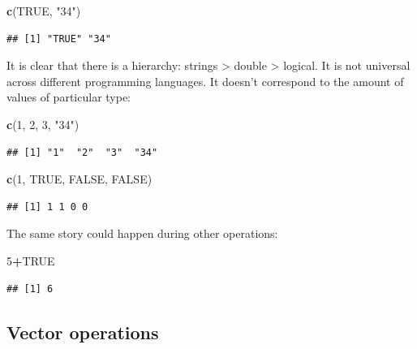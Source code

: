 \documentclass[
]{book}
\newenvironment{Shaded}{\begin{snugshade}}{\end{snugshade}}
\newcommand{\DecValTok}[1]{\textcolor[rgb]{0.00,0.00,0.81}{#1}}
\newcommand{\KeywordTok}[1]{\textcolor[rgb]{0.13,0.29,0.53}{\textbf{#1}}}
\newcommand{\NormalTok}[1]{#1}
\newcommand{\OperatorTok}[1]{\textcolor[rgb]{0.81,0.36,0.00}{\textbf{#1}}}
\newcommand{\OtherTok}[1]{\textcolor[rgb]{0.56,0.35,0.01}{#1}}
\newcommand{\StringTok}[1]{\textcolor[rgb]{0.31,0.60,0.02}{#1}}
\begin{document}
\begin{Shaded}
\begin{Highlighting}[]
\KeywordTok{c}\NormalTok{(}\OtherTok{TRUE}\NormalTok{, }\StringTok{"34"}\NormalTok{)}
\end{Highlighting}
\end{Shaded}

\begin{verbatim}
## [1] "TRUE" "34"
\end{verbatim}

It is clear that there is a hierarchy: strings \textgreater{} double \textgreater{} logical. It is not universal across different programming languages. It doesn't correspond to the amount of values of particular type:

\begin{Shaded}
\begin{Highlighting}[]
\KeywordTok{c}\NormalTok{(}\DecValTok{1}\NormalTok{, }\DecValTok{2}\NormalTok{, }\DecValTok{3}\NormalTok{, }\StringTok{"34"}\NormalTok{)}
\end{Highlighting}
\end{Shaded}

\begin{verbatim}
## [1] "1"  "2"  "3"  "34"
\end{verbatim}

\begin{Shaded}
\begin{Highlighting}[]
\KeywordTok{c}\NormalTok{(}\DecValTok{1}\NormalTok{, }\OtherTok{TRUE}\NormalTok{, }\OtherTok{FALSE}\NormalTok{, }\OtherTok{FALSE}\NormalTok{)}
\end{Highlighting}
\end{Shaded}

\begin{verbatim}
## [1] 1 1 0 0
\end{verbatim}

The same story could happen during other operations:

\begin{Shaded}
\begin{Highlighting}[]
\DecValTok{5}\OperatorTok{+}\OtherTok{TRUE}
\end{Highlighting}
\end{Shaded}

\begin{verbatim}
## [1] 6
\end{verbatim}

\hypertarget{vector-operations}{%
\subsection{Vector operations}\label{vector-operations}}
\end{document}

